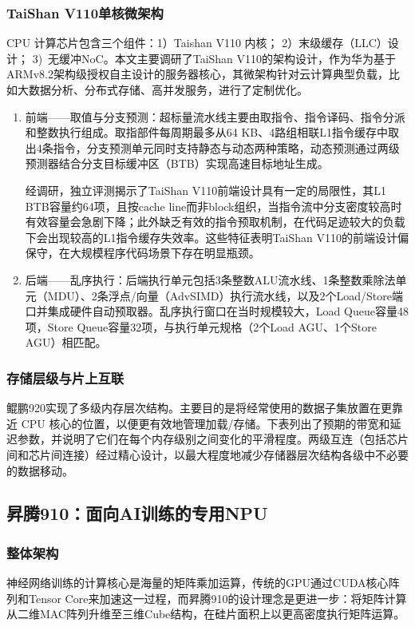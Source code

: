 \documentclass[a4paper]{article}
\begin{document}
\subsubsection{TaiShan V110单核微架构}
CPU 计算芯片包含三个组件：1）Taishan V110 内核； 2）末级缓存（LLC）设计； 3) 无缓冲NoC。本文主要调研了TaiShan V110的架构设计，作为华为基于ARMv8.2架构级授权自主设计的服务器核心，其微架构针对云计算典型负载，比如大数据分析、分布式存储、高并发服务，进行了定制优化。
\begin{enumerate}
  \item 前端——取值与分支预测：超标量流水线主要由取指令、指令译码、指令分派和整数执行组成。取指部件每周期最多从64 KB、4路组相联L1指令缓存中取出4条指令，分支预测单元同时支持静态与动态两种策略，动态预测通过两级预测器结合分支目标缓冲区（BTB）实现高速目标地址生成。

  经调研，独立评测揭示了TaiShan V110前端设计具有一定的局限性，其L1 BTB容量约64项，且按cache line而非block组织，当指令流中分支密度较高时有效容量会急剧下降；此外缺乏有效的指令预取机制，在代码足迹较大的负载下会出现较高的L1指令缓存失效率。这些特征表明TaiShan V110的前端设计偏保守，在大规模程序代码场景下存在明显瓶颈。
  \item 后端——乱序执行：后端执行单元包括3条整数ALU流水线、1条整数乘除法单元（MDU）、2条浮点/向量（AdvSIMD）执行流水线，以及2个Load/Store端口并集成硬件自动预取器。乱序执行窗口在当时规模较大，Load Queue容量48项，Store Queue容量32项，与执行单元规格（2个Load AGU、1个Store AGU）相匹配。
  
\end{enumerate}

\subsubsection{存储层级与片上互联}
鲲鹏920实现了多级内存层次结构。主要目的是将经常使用的数据子集放置在更靠近 CPU 核心的位置，以便更有效地管理加载/存储。下表列出了预期的带宽和延迟参数，并说明了它们在每个内存级别之间变化的平滑程度。两级互连（包括芯片间和芯片间连接）经过精心设计，以最大程度地减少存储器层次结构各级中不必要的数据移动。

\subsection{昇腾910：面向AI训练的专用NPU}

\subsubsection{整体架构}
神经网络训练的计算核心是海量的矩阵乘加运算，传统的GPU通过CUDA核心阵列和Tensor Core来加速这一过程，而昇腾910的设计理念是更进一步：将矩阵计算从二维MAC阵列升维至三维Cube结构，在硅片面积上以更高密度执行矩阵运算。
\end{document}
